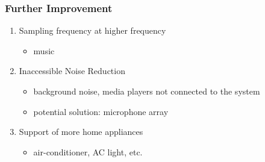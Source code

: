 \begin{frame}
\frametitle{Further Improvement}

\begin{enumerate}
	\item Sampling frequency at higher frequency
	\begin{itemize}
		\item music
	\end{itemize}
	\item Inaccessible Noise Reduction
	\begin{itemize}
		\item background noise, media players not connected to the system
		\item potential solution: microphone array
	\end{itemize}
	\item Support of more home appliances
	\begin{itemize}
		\item air-conditioner, AC light, etc.
	\end{itemize}
\end{enumerate}
\end{frame}
